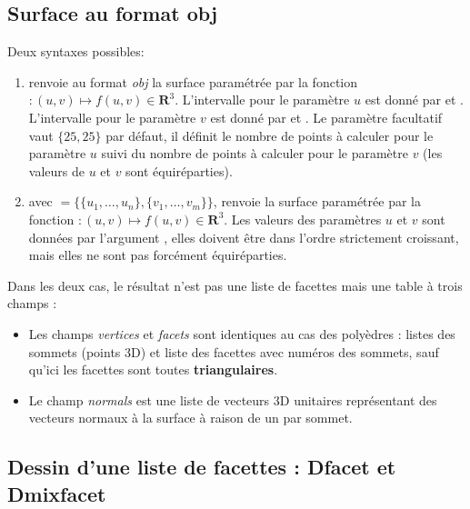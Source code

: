 \subsection{Surface au format obj}

Deux syntaxes possibles:
\begin{enumerate}
    \item {} renvoie au format \emph{obj} la surface paramétrée par la fonction $\colon(u,v) \mapsto f(u,v)\in \mathbf R^3$. L'intervalle pour le paramètre $u$ est donné par  et . L'intervalle pour le paramètre $v$ est donné par  et . Le paramètre facultatif  vaut $\{25,25\}$ par défaut, il définit le nombre de points à calculer pour le paramètre $u$ suivi du nombre de points à calculer pour le paramètre $v$ (les valeurs de $u$ et $v$ sont équiréparties).
    
    \item {} avec $=\{\{u_1,\ldots,u_n\}, \{v_1,\ldots,v_m\}\}$, renvoie la surface paramétrée par la fonction $\colon(u,v) \mapsto f(u,v)\in \mathbf R^3$. Les valeurs des paramètres $u$ et $v$ sont données par l'argument , elles doivent être dans l'ordre strictement croissant, mais elles ne sont pas forcément équiréparties.
\end{enumerate}
Dans les deux cas, le résultat n'est pas une liste de facettes mais une table à trois champs :
    \begin{itemize}
        \item Les champs \emph{vertices} et \emph{facets} sont identiques au cas des polyèdres : listes des sommets (points 3D) et liste des facettes avec numéros des sommets, sauf qu'ici les facettes sont toutes \textbf{triangulaires}.
        \item Le champ \emph{normals} est une liste de vecteurs 3D unitaires représentant des vecteurs normaux à la surface à raison de un par sommet.
    \end{itemize}



\subsection{Dessin d'une liste de facettes : Dfacet et Dmixfacet}


